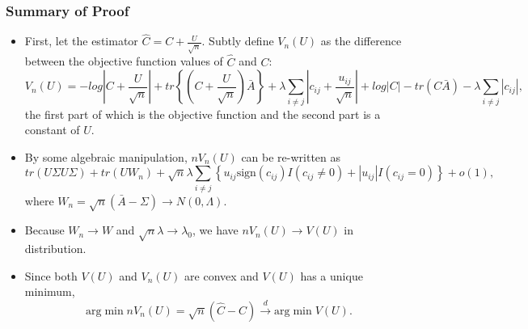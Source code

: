 \documentclass[11pt]{article} %
\begin{document}
\subsubsection{Summary of Proof}
\begin{itemize}
\item First, let the estimator $\hat{C}=C+\frac{U}{\sqrt{n}}$. Subtly define $V_n(U)$ as the difference between the objective function values of $\hat{C}$ and $C$: \[V_n(U)=-log\left\vert C+\frac{U}{\sqrt{n}}\right\vert +tr\left\lbrace \left( C+\frac{U}{\sqrt{n}}\right) \bar{A}\right\rbrace +\lambda \sum_{i\neq j} \left\vert c_{ij}+\frac{u_{ij}}{\sqrt{n}}\right\vert +log|C|-tr(C\bar{A})-\lambda \sum_{i\neq j}|c_{ij}|\mbox{,}\]
the first part of which is the objective function and the second part is a constant of $U$. 
\item By some algebraic manipulation, $nV_n(U)$ can be re-written as \[tr(U\Sigma U\Sigma )+tr(UW_n)+\sqrt{n} \lambda \sum_{i\neq j}\left\lbrace u_{ij} \mbox{sign} (c_{ij})I(c_{ij}\neq 0)+|u_{ij}| I(c_{ij} =0)\right\rbrace +o(1)\mbox{,}\]
where $W_n=\sqrt{n}(\bar{A}-\Sigma)\rightarrow N(0,\Lambda)$. 
\item Because $W_n\rightarrow W$ and $\sqrt{n} \lambda \rightarrow \lambda_0$, we have $nV_n(U)\rightarrow V(U)$ in distribution. 
\item Since both $V(U)$ and $V_n(U)$ are convex and $V(U)$ has a unique minimum, \[\mbox{arg} \min nV_n\left( U\right)=\sqrt{n} \left( \hat{C} - C\right) \stackrel{d}{\rightarrow} \mbox{arg} \min V\left( U\right) \mbox{.} \]
\end{itemize}
\end{document}
